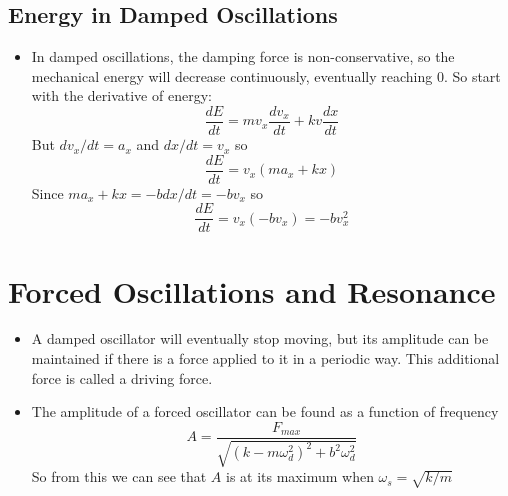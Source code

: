 \documentclass[11pt, a4paper]{article}
\begin{document}
\subsection{Energy in Damped Oscillations}
\begin{itemize}
    \item In damped oscillations, the damping force is non-conservative, so the mechanical energy will
        decrease continuously, eventually reaching 0. So start with the derivative of energy:
        \begin{equation}
            \frac{dE}{dt} = mv_{x}\frac{dv_{x}}{dt} + kv\frac{dx}{dt}
        \end{equation}
        But $dv_{x}/dt = a_{x}$ and $dx/dt = v_{x}$ so
        \begin{equation}
            \frac{dE}{dt} = v_{x}(ma_{x} + kx)
        \end{equation}
        Since $ma_{x} + kx = -bdx/dt = -bv_{x}$ so
        \begin{equation}
            \frac{dE}{dt} = v_{x}(-bv_{x}) = -bv_{x}^{2}
        \end{equation}
\end{itemize}
\section{Forced Oscillations and Resonance}
\begin{itemize}
    \item A damped oscillator will eventually stop moving, but its amplitude can be maintained
        if there is a force applied to it in a periodic way. This additional force is called a
        driving force.
    \item The amplitude of a forced oscillator can be found as a function of frequency 
        \begin{equation}
            A = \frac{F_{max}}{\sqrt{(k-m\omega^{2}_{d})^{2} + b^{2}\omega_{d}^{2}}}
        \end{equation}
        So from this we can see that $A$ is at its maximum when $\omega_{s} = \sqrt{k/m}$
\end{itemize}
\end{document}

